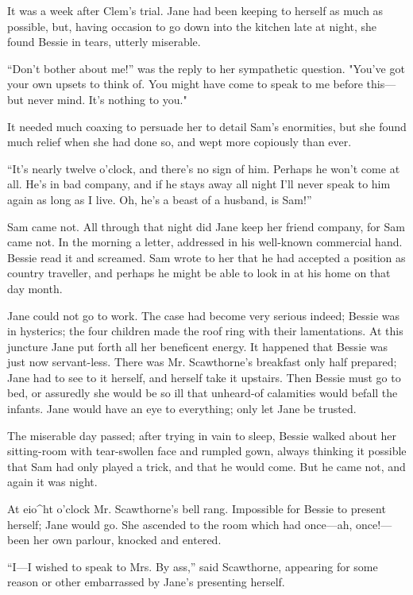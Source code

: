 It was a week after Clem's trial. Jane had been keeping to herself as
much as possible, but, having occasion to go down into the kitchen late
at night, she found Bessie in tears, utterly miserable.

``Don't bother about me!'' was the reply to her sympathetic question.
"You've got {\protect\hypertarget{294}{}{}} your own upsets to think of.
You might have come to speak to me before this---but never mind. It's
nothing to you."

It needed much coaxing to persuade her to detail Sam's enormities, but
she found much relief when she had done so, and wept more copiously than
ever.

``It's nearly twelve o'clock, and there's no sign of him. Perhaps he
won't come at all. He's in bad company, and if he stays away all night
I'll never speak to him again as long as I live. Oh, he's a beast of a
husband, is Sam!''

Sam came not. All through that night did Jane keep her friend company,
for Sam came not. In the morning a letter, addressed in his well-known
commercial hand. Bessie read it and screamed. Sam wrote to her that he
had accepted a position as country traveller, and perhaps he might be
able to look in at his home on that day month.

Jane could not go to work. The case had become very serious indeed;
Bessie was in hysterics; the four children made the roof ring with their
lamentations. At this juncture Jane put forth all her beneficent energy.
{\protect\hypertarget{295}{}{}} It happened that Bessie was just now
servant-less. There was Mr. Scawthorne's breakfast only half prepared;
Jane had to see to it herself, and herself take it upstairs. Then Bessie
must go to bed, or assuredly she would be so ill that unheard-of
calamities would befall the infants. Jane would have an eye to
everything; only let Jane be trusted.

The miserable day passed; after trying in vain to sleep, Bessie walked
about her sitting-room with tear-swollen face and rumpled gown, always
thinking it possible that Sam had only played a trick, and that he would
come. But he came not, and again it was night.

At eio\^{}ht o'clock Mr. Scawthorne's bell rang. Impossible for Bessie
to present herself; Jane would go. She ascended to the room which had
once---ah, once!---been her own parlour, knocked and entered.

``I---I wished to speak to Mrs. By ass,'' said Scawthorne, appearing for
some reason or other embarrassed by Jane's presenting herself.

